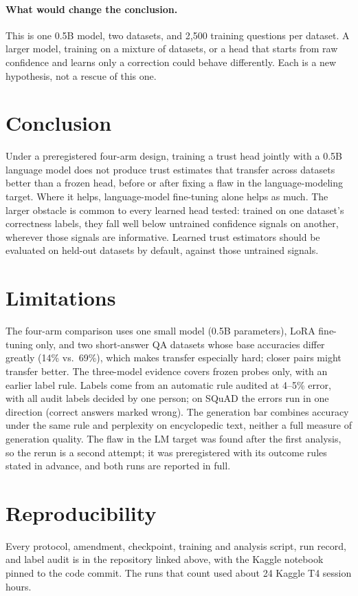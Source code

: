 \documentclass[11pt]{article}
\begin{document}
\paragraph{What would change the conclusion.} This is one 0.5B model, two datasets, and 2,500 training questions per dataset. A larger model, training on a mixture of datasets, or a head that starts from raw confidence and learns only a correction could behave differently. Each is a new hypothesis, not a rescue of this one.

\section{Conclusion}

Under a preregistered four-arm design, training a trust head jointly with a 0.5B language model does not produce trust estimates that transfer across datasets better than a frozen head, before or after fixing a flaw in the language-modeling target. Where it helps, language-model fine-tuning alone helps as much. The larger obstacle is common to every learned head tested: trained on one dataset's correctness labels, they fall well below untrained confidence signals on another, wherever those signals are informative. Learned trust estimators should be evaluated on held-out datasets by default, against those untrained signals.

\section*{Limitations}

The four-arm comparison uses one small model (0.5B parameters), LoRA fine-tuning only, and two short-answer QA datasets whose base accuracies differ greatly (14\% vs.\ 69\%), which makes transfer especially hard; closer pairs might transfer better. The three-model evidence covers frozen probes only, with an earlier label rule. Labels come from an automatic rule audited at 4--5\% error, with all audit labels decided by one person; on SQuAD the errors run in one direction (correct answers marked wrong). The generation bar combines accuracy under the same rule and perplexity on encyclopedic text, neither a full measure of generation quality. The flaw in the LM target was found after the first analysis, so the rerun is a second attempt; it was preregistered with its outcome rules stated in advance, and both runs are reported in full.

\section*{Reproducibility}

Every protocol, amendment, checkpoint, training and analysis script, run record, and label audit is in the repository linked above, with the Kaggle notebook pinned to the code commit. The runs that count used about 24 Kaggle T4 session hours.


\end{document}
